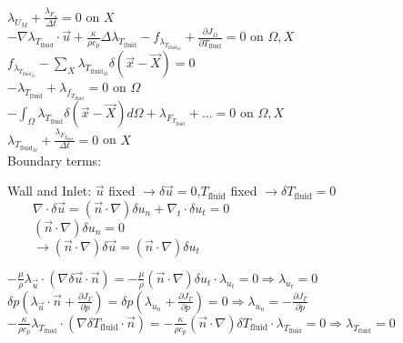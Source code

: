 \documentclass[10pt]{article} %
\begin{document}
\begin{center}
	$\lambda_{U_M} + \frac{\lambda_{F_u}}{\Delta t}=0$ \quad on $X$\\
	$-\nabla \lambda_{T_{\text{fluid}}} \cdot \vec{u} + \frac{\kappa}{\rho c_p} \Delta  \lambda_{T_{\text{fluid}}} - f_{\lambda_{T_{\text{fluid}_M}}} + \frac{\partial J_{\Omega}}{\partial T_{\text{fluid}}} = 0$ \quad on $\Omega,X$\\
	$f_{\lambda_{T_{\text{fluid}_M}}} - \sum_{X} \lambda_{T_{\text{fluid}_M}} \delta (\vec{x}-\vec{X}) = 0$\\
	$- \lambda_{T_{\text{fluid}}} +\lambda_{f_{T_{\text{fluid}}}} = 0$ \quad on $\Omega$\\
	$-\int_{\Omega} \lambda_{T_{\text{fluid}}} \delta (\vec{x}-\vec{X}) d\Omega + \lambda_{F_{T_{\text{fluid}}}} + ... = 0$ \quad on $\Omega, X$\\
	$\lambda_{T_{\text{fluid}_M}} + \frac{\lambda_{F_{T_{\text{fluid}}}}}{\Delta t} =0$ \quad on $X$\\
	$ $\\
Boundary terms:\\
\begin{flushleft}
	Wall and Inlet: $\vec{u}$ fixed $\rightarrow \delta \vec{u}=0$,$T_{\text{fluid}}$ fixed $\rightarrow \delta T_{\text{fluid}}=0$\\
	$\quad \quad \nabla \cdot \delta \vec{u} = \left(\vec{n} \cdot \nabla\right) \delta u_n + \nabla_{t} \cdot \delta u_t = 0$\\
	$\quad \quad \left(\vec{n} \cdot \nabla\right) \delta u_n = 0$\\
	$\quad \quad \rightarrow \left(\vec{n} \cdot \nabla\right) \delta \vec{u} = \left(\vec{n} \cdot \nabla\right) \delta u_t $\\
\end{flushleft}
	$ -\frac{\mu}{\rho} \lambda_{\vec{u}} \cdot \left(\nabla \delta \vec{u} \cdot \vec{n}\right) = -\frac{\mu}{\rho}\left(\vec{n} \cdot \nabla\right) \delta u_t  \cdot  \lambda_{u_t} = 0 \Rightarrow \lambda_{u_t} = 0$\\
	$\delta p \left(\lambda_{\vec{u}} \cdot \vec{n} + \frac{\partial J_{\Gamma}}{\partial p} \right)= \delta p \left(\lambda_{u_n} + \frac{\partial J_{\Gamma}}{\partial p} \right)=0  \Rightarrow \lambda_{u_n} = -\frac{\partial J_{\Gamma}}{\partial p}$\\
	$ -\frac{\kappa}{\rho c_p} \lambda_{T_{\text{fluid}}} \cdot \left(\nabla \delta T_{\text{fluid}} \cdot \vec{n}\right) = -\frac{\kappa}{\rho c_p}  \left(\vec{n} \cdot \nabla\right) \delta T_{\text{fluid}} \cdot \lambda_{T_{\text{fluid}}} = 0  \Rightarrow \lambda_{T_{\text{fluid}}} = 0$\\

\end{center}
\end{document}
